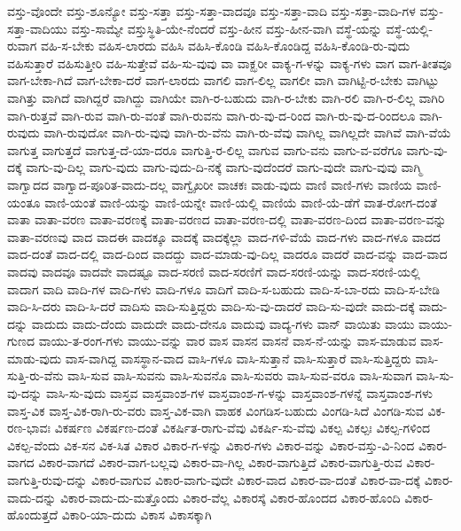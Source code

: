 {ವಸ್ತು-ವೊಂದೇ
ವಸ್ತು-ಶೂನ್ಯೋ
ವಸ್ತು-ಸತ್ತಾ
ವಸ್ತು-ಸತ್ತಾ-ವಾದವೂ
ವಸ್ತು-ಸತ್ತಾ-ವಾದಿ
ವಸ್ತು-ಸತ್ತಾ-ವಾದಿ-ಗಳ
ವಸ್ತು-ಸತ್ತಾ-ವಾದಿಯು
ವಸ್ತು-ಸಾಮ್ಯೇ
ವಸ್ತುಸ್ಥಿತಿ-ಯೇ-ನೆಂದರೆ
ವಸ್ತು-ಹೀನ
ವಸ್ತು-ಹೀನ-ವಾಗಿ
ವಸ್ಥೆ-ಯನ್ನು
ವಸ್ಥೆ-ಯಲ್ಲಿ-ರುವಾಗ
ವಹಿ-ಸ-ಬೇಕು
ವಹಿಸ-ಲಾರದು
ವಹಿಸಿ
ವಹಿಸಿ-ಕೊಂಡಿ
ವಹಿಸಿ-ಕೊಂಡಿದ್ದ
ವಹಿಸಿ-ಕೊಂಡಿ-ರು-ವುದು
ವಹಿಸುತ್ತಾರೆ
ವಹಿಸುತ್ತೀರಿ
ವಹಿ-ಸುತ್ತೇವೆ
ವಹಿ-ಸು-ವುವು
ವಾ
ವಾಕ್ಝರೀ
ವಾಕ್ಯ-ಗ-ಳನ್ನು
ವಾಕ್ಯ-ಗಳು
ವಾಗ
ವಾಗ-ತೀತವೂ
ವಾಗ-ಬೇಕಾ-ಗಿದೆ
ವಾಗ-ಬೇಕಾ-ದರೆ
ವಾಗ-ಲಾರದು
ವಾಗಲಿ
ವಾಗ-ಲಿಲ್ಲ
ವಾಗಲೀ
ವಾಗಿ
ವಾಗಿಟ್ಟಿ-ರ-ಬೇಕು
ವಾಗಿಟ್ಟು
ವಾಗಿತ್ತು
ವಾಗಿದೆ
ವಾಗಿದ್ದರೆ
ವಾಗಿದ್ದು
ವಾಗಿಯೇ
ವಾಗಿ-ರ-ಬಹುದು
ವಾಗಿ-ರ-ಬೇಕು
ವಾಗಿ-ರಲಿ
ವಾಗಿ-ರ-ಲಿಲ್ಲ
ವಾಗಿರಿ
ವಾಗಿ-ರುತ್ತವೆ
ವಾಗಿ-ರುವ
ವಾಗಿ-ರು-ವಂತೆ
ವಾಗಿ-ರುವನು
ವಾಗಿ-ರು-ವು-ದ-ರಿಂದ
ವಾಗಿ-ರು-ವು-ದ-ರಿಂದಲೂ
ವಾಗಿ-ರುವುದು
ವಾಗಿ-ರುವುದೋ
ವಾಗಿ-ರು-ವುವು
ವಾಗಿ-ರು-ವೆನು
ವಾಗಿ-ರು-ವೆವು
ವಾಗಿಲ್ಲ
ವಾಗಿಲ್ಲದೇ
ವಾಗಿವೆ
ವಾಗಿ-ವೆಯೆ
ವಾಗುತ್ತ
ವಾಗುತ್ತದೆ
ವಾಗುತ್ತ-ದೆ-ಯಾ-ದರೂ
ವಾಗುತ್ತಿ-ರ-ಲಿಲ್ಲ
ವಾಗುವ
ವಾಗು-ವನು
ವಾಗು-ವ-ವರೆಗೂ
ವಾಗು-ವು-ದಕ್ಕೆ
ವಾಗು-ವು-ದಿಲ್ಲ
ವಾಗು-ವುದು
ವಾಗು-ವುದು-ದಿ-ನಕ್ಕೆ
ವಾಗು-ವುದೆಂದರೆ
ವಾಗು-ವುದೇ
ವಾಗು-ವುವು
ವಾಗ್ಮಿ
ವಾಗ್ವಾದದ
ವಾಗ್ವಾದ-ಪೂರಿತ-ವಾದು-ದಲ್ಲ
ವಾಗ್ವೈಖರೀ
ವಾಚಕಃ
ವಾಡು-ವುದು
ವಾಣಿ
ವಾಣಿ-ಗಳು
ವಾಣಿಯ
ವಾಣಿ-ಯಂತೂ
ವಾಣಿ-ಯಂತೆ
ವಾಣಿ-ಯನ್ನು
ವಾಣಿ-ಯನ್ನೇ
ವಾಣಿ-ಯಲ್ಲಿ
ವಾಣಿಯೆ
ವಾಣಿ-ಯೆ-ಡೆಗೆ
ವಾತ-ರೋಗ-ದಂತೆ
ವಾತಾ
ವಾತಾ-ವರಣ
ವಾತಾ-ವರಣಕ್ಕೆ
ವಾತಾ-ವರಣದ
ವಾತಾ-ವರಣ-ದಲ್ಲಿ
ವಾತಾ-ವರಣ-ದಿಂದ
ವಾತಾ-ವರಣ-ವನ್ನು
ವಾತಾ-ವರಣವು
ವಾದ
ವಾದಈ
ವಾದಕ್ಕೂ
ವಾದಕ್ಕೆ
ವಾದಕ್ಕೆಲ್ಲಾ
ವಾದ-ಗಳಿ-ವೆಯೆ
ವಾದ-ಗಳು
ವಾದ-ಗಳೂ
ವಾದದ
ವಾದ-ದಂತೆ
ವಾದ-ದಲ್ಲಿ
ವಾದ-ದಿಂದ
ವಾದದ್ದು
ವಾದ-ಮಾಡು-ವು-ದಿಲ್ಲ
ವಾದರೂ
ವಾದರೆ
ವಾದ-ವನ್ನು
ವಾದ-ವಾದ
ವಾದವು
ವಾದವೂ
ವಾದವೇ
ವಾದಷ್ಟೂ
ವಾದ-ಸರಣಿ
ವಾದ-ಸರಣಿಗೆ
ವಾದ-ಸರಣಿ-ಯನ್ನು
ವಾದ-ಸರಣಿ-ಯಲ್ಲಿ
ವಾದಾಗ
ವಾದಿ
ವಾದಿ-ಗಳ
ವಾದಿ-ಗಳು
ವಾದಿ-ಗಳೂ
ವಾದಿಗೆ
ವಾದಿ-ಸ-ಬಹುದು
ವಾದಿ-ಸ-ಬಾ-ರದು
ವಾದಿ-ಸ-ಬೇಡಿ
ವಾದಿ-ಸಿ-ದರು
ವಾದಿ-ಸಿ-ದರೆ
ವಾದಿಸು
ವಾದಿ-ಸುತ್ತಿದ್ದರು
ವಾದಿ-ಸು-ವು-ದಾದರೆ
ವಾದಿ-ಸು-ವುದೇ
ವಾದು-ದಕ್ಕೆ
ವಾದು-ದನ್ನು
ವಾದುದು
ವಾದು-ದೆಂದು
ವಾದುದೇ
ವಾದು-ದೇನೂ
ವಾದುವು
ವಾದ್ಯ-ಗಳು
ವಾನ್
ವಾಯಿತು
ವಾಯು
ವಾಯು-ಗುಣದ
ವಾಯು-ತ-ರಂಗ-ಗಳು
ವಾಯು-ವನ್ನು
ವಾರ
ವಾಸ
ವಾಸನ
ವಾಸನೆ
ವಾಸ-ನೆ-ಯನ್ನು
ವಾಸ-ಮಾಡುವ
ವಾಸ-ಮಾಡು-ವುದು
ವಾಸ-ವಾಗಿದ್ದ
ವಾಸಸ್ಥಾನ-ವಾದ
ವಾಸಿ-ಗಳೂ
ವಾಸಿ-ಸುತ್ತಾನೆ
ವಾಸಿ-ಸುತ್ತಾರೆ
ವಾಸಿ-ಸುತ್ತಿದ್ದರು
ವಾಸಿ-ಸುತ್ತಿ-ರು-ವೆನು
ವಾಸಿ-ಸುವ
ವಾಸಿ-ಸುವನು
ವಾಸಿ-ಸುವನೊ
ವಾಸಿ-ಸುವರು
ವಾಸಿ-ಸುವ-ವರೂ
ವಾಸಿ-ಸುವಾಗ
ವಾಸಿ-ಸು-ವು-ದನ್ನು
ವಾಸಿ-ಸು-ವುದು
ವಾಸ್ತವ
ವಾಸ್ತವಾಂಶ-ಗಳ
ವಾಸ್ತವಾಂಶ-ಗ-ಳನ್ನು
ವಾಸ್ತವಾಂಶ-ಗಳನ್ನೆ
ವಾಸ್ತವಾಂಶ-ಗಳು
ವಾಸ್ತ-ವಿಕ
ವಾಸ್ತ-ವಿಕ-ರಾಗಿ-ರು-ವರು
ವಾಸ್ತ-ವಿಕ-ವಾಗಿ
ವಾಹಕ
ವಿಂಗಡಿಸ-ಬಹುದು
ವಿಂಗಡಿ-ಸಿದೆ
ವಿಂಗಡಿ-ಸುವ
ವಿಕ-ರಣ-ಭಾವಃ
ವಿಕರ್ಷಣ
ವಿಕರ್ಷಣ-ದಂತೆ
ವಿಕರ್ಷಿತ-ರಾಗು-ವೆವು
ವಿಕರ್ಷಿ-ಸು-ವೆವು
ವಿಕಲ್ಪ
ವಿಕಲ್ಪಃ
ವಿಕಲ್ಪ-ಗಳಿಂದ
ವಿಕಲ್ಪ-ವೆಂದು
ವಿಕ-ಸನ
ವಿಕ-ಸಿತ
ವಿಕಾರ
ವಿಕಾರ-ಗ-ಳನ್ನು
ವಿಕಾರ-ಗಳು
ವಿಕಾರ-ವನ್ನು
ವಿಕಾರ-ವಸ್ತು-ವಿ-ನಿಂದ
ವಿಕಾರ-ವಾಗದ
ವಿಕಾರ-ವಾಗದೆ
ವಿಕಾರ-ವಾಗ-ಬಲ್ಲವು
ವಿಕಾರ-ವಾ-ಗಿಲ್ಲ
ವಿಕಾರ-ವಾಗುತ್ತಿದೆ
ವಿಕಾರ-ವಾಗುತ್ತಿ-ರುವ
ವಿಕಾರ-ವಾಗುತ್ತಿ-ರುವು-ದನ್ನು
ವಿಕಾರ-ವಾಗುವ
ವಿಕಾರ-ವಾಗು-ವುದೇ
ವಿಕಾರ-ವಾದ
ವಿಕಾರ-ವಾ-ದಂತೆ
ವಿಕಾರ-ವಾ-ದಕ್ಕೆ
ವಿಕಾರ-ವಾದು-ದನ್ನು
ವಿಕಾರ-ವಾದು-ದು-ಮತ್ತೊಂದು
ವಿಕಾರ-ವೆಲ್ಲ
ವಿಕಾರಸ್ಕೆ
ವಿಕಾರ-ಹೊಂದದ
ವಿಕಾರ-ಹೊಂದಿ
ವಿಕಾರ-ಹೊಂದುತ್ತದೆ
ವಿಕಾರಿ-ಯಾ-ದುದು
ವಿಕಾಸ
ವಿಕಾಸಕ್ಕಾಗಿ
}
